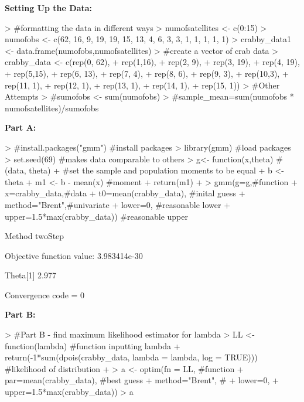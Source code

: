\documentclass{article}
\begin{document}
\begin{enumerate}
\textbf{Setting Up the Data:}
\begin{Schunk}
\begin{Sinput}
> #formatting the data in different ways
> numofsatellites <- c(0:15)
> numofobs <- c(62, 16, 9, 19, 19, 15, 13, 4, 6, 3, 3, 1, 1, 1, 1, 1)
> crabby_data1 <- data.frame(numofobs,numofsatellites)
> #create a vector of crab data
> crabby_data <- c(rep(0, 62),
+                  rep(1,16),
+                  rep(2, 9),
+                  rep(3, 19),
+                  rep(4, 19),
+                  rep(5,15),
+                  rep(6, 13),
+                  rep(7, 4),
+                  rep(8, 6),
+                  rep(9, 3),
+                  rep(10,3),
+                  rep(11, 1),
+                  rep(12, 1),
+                  rep(13, 1),
+                  rep(14, 1),
+                  rep(15, 1))
> #Other Attempts
> #sumofobs <- sum(numofobs)
> #sample_mean=sum(numofobs * numofsatellites)/sumofobs
\end{Sinput}
\end{Schunk}

\textbf{Part A:}
\begin{Schunk}
\begin{Sinput}
> #install.packages("gmm") #install packages
> library(gmm) #load packages
> set.seed(69) #makes data comparable to others
> g<- function(x,theta) { #(data, theta)
+   #set the sample and population moments to be equal
+   b <- theta
+   m1 <- b - mean(x) #moment
+   return(m1)
+ }
> gmm(g=g,#function
+     x=crabby_data,#data
+     t0=mean(crabby_data), #inital guess
+     method="Brent",#univariate
+     lower=0, #reasonable lower
+     upper=1.5*max(crabby_data)) #reasonable upper
\end{Sinput}
\begin{Soutput}
Method
 twoStep 

Objective function value:  3.983414e-30 

Theta[1]  
   2.977  

Convergence code =  0 
\end{Soutput}
\end{Schunk}

\textbf{Part B:}
\begin{Schunk}
\begin{Sinput}
> #Part B - find maximum likelihood estimator for lambda
> LL <- function(lambda) { #function inputting lambda
+   return(-1*sum(dpois(crabby_data, lambda = lambda, log = TRUE))) #likelihood of distribution
+ }
> a <- optim(fn = LL, #function
+       par=mean(crabby_data), #best guess
+       method="Brent", #
+       lower=0, 
+       upper=1.5*max(crabby_data))
> a
\end{Sinput}
\end{Schunk}
\end{enumerate}
\end{document}
